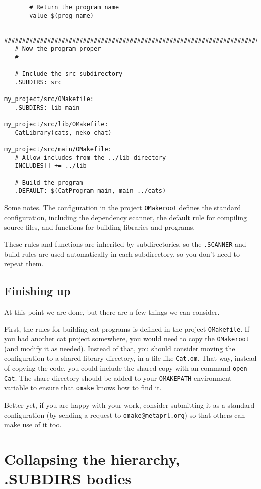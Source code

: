 \begin{verbatim}
       # Return the program name
       value $(prog_name)

   ########################################################################
   # Now the program proper
   #

   # Include the src subdirectory
   .SUBDIRS: src

my_project/src/OMakefile:
   .SUBDIRS: lib main

my_project/src/lib/OMakefile:
   CatLibrary(cats, neko chat)

my_project/src/main/OMakefile:
   # Allow includes from the ../lib directory
   INCLUDES[] += ../lib

   # Build the program
   .DEFAULT: $(CatProgram main, main ../cats)
\end{verbatim}

Some notes.  The configuration in the project \verb+OMakeroot+ defines the standard configuration, including
the dependency scanner, the default rule for compiling source files, and functions for building
libraries and programs.

These rules and functions are inherited by subdirectories, so the \verb+.SCANNER+ and build rules
are used automatically in each subdirectory, so you don't need to repeat them.

\subsection{Finishing up}

At this point we are done, but there are a few things we can consider.

First, the rules for building cat programs is defined in the project \verb+OMakefile+.  If you had
another cat project somewhere, you would need to copy the \verb+OMakeroot+ (and modify it as
needed).  Instead of that, you should consider moving the configuration to a shared library
directory, in a file like \verb+Cat.om+.  That way, instead of copying the code, you could include
the shared copy with an \OMake command \verb+open Cat+.  The share directory should be added to your
\verb+OMAKEPATH+ environment variable to ensure that \verb+omake+ knows how to find it.

Better yet, if you are happy with your work, consider submitting it as a standard configuration (by
sending a request to \verb+omake@metaprl.org+) so that others can make use of it too.

\section{Collapsing the hierarchy, .SUBDIRS bodies}

